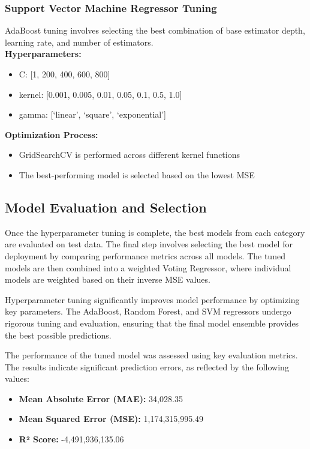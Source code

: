 \subsubsection{Support Vector Machine Regressor Tuning}\label{sec:svm_regressor_tuning}

AdaBoost tuning involves selecting the best combination of base estimator depth, learning rate, and number of
estimators. \\

\textbf{Hyperparameters:}

\begin{itemize}
    \item C: [1, 200, 400, 600, 800]
    \item kernel: [0.001, 0.005, 0.01, 0.05, 0.1, 0.5, 1.0]
    \item gamma: [`linear', `square', `exponential']
\end{itemize}


\textbf{Optimization Process:}

\begin{itemize}
    \item GridSearchCV is performed across different kernel functions
    \item The best-performing model is selected based on the lowest MSE
\end{itemize}

\subsection{Model Evaluation and Selection}\label{sec:model_evaluation_and_selection}
Once the hyperparameter tuning is complete, the best models from each category are evaluated on
test data. The final step involves selecting the best model for deployment by comparing performance
metrics across all models. The tuned models are then combined into a weighted Voting Regressor,
where individual models are weighted based on their inverse MSE values.

Hyperparameter tuning significantly improves model performance by optimizing key parameters. The
AdaBoost, Random Forest, and SVM regressors undergo rigorous tuning and evaluation, ensuring that
the final model ensemble provides the best possible predictions.

The performance of the tuned model was assessed using key evaluation metrics. The results indicate
significant prediction errors, as reflected by the following values:

\begin{itemize}
    \item \textbf{Mean Absolute Error (MAE):} 34,028.35
    \item \textbf{Mean Squared Error (MSE):} 1,174,315,995.49
    \item \textbf{R² Score:} -4,491,936,135.06
\end{itemize}

